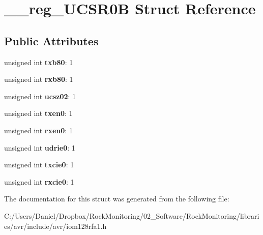 \hypertarget{struct____reg___u_c_s_r0_b}{}\section{\+\_\+\+\_\+reg\+\_\+\+U\+C\+S\+R0B Struct Reference}
\label{struct____reg___u_c_s_r0_b}
\subsection*{Public Attributes}
\begin{DoxyCompactItemize}
\item 
unsigned int {\bfseries txb80}\+: 1\hypertarget{struct____reg___u_c_s_r0_b_adb562bf4f13fedb25dca671f115b79e2}{}\label{struct____reg___u_c_s_r0_b_adb562bf4f13fedb25dca671f115b79e2}

\item 
unsigned int {\bfseries rxb80}\+: 1\hypertarget{struct____reg___u_c_s_r0_b_abae8698593da501386792b7777e99520}{}\label{struct____reg___u_c_s_r0_b_abae8698593da501386792b7777e99520}

\item 
unsigned int {\bfseries ucsz02}\+: 1\hypertarget{struct____reg___u_c_s_r0_b_a448acdc96971fb1689a6fa24acd8318f}{}\label{struct____reg___u_c_s_r0_b_a448acdc96971fb1689a6fa24acd8318f}

\item 
unsigned int {\bfseries txen0}\+: 1\hypertarget{struct____reg___u_c_s_r0_b_acb5856e8bb893d9a1f32c034e5aa905a}{}\label{struct____reg___u_c_s_r0_b_acb5856e8bb893d9a1f32c034e5aa905a}

\item 
unsigned int {\bfseries rxen0}\+: 1\hypertarget{struct____reg___u_c_s_r0_b_a1266f6b6c1b8da2b26c531171ee64cb6}{}\label{struct____reg___u_c_s_r0_b_a1266f6b6c1b8da2b26c531171ee64cb6}

\item 
unsigned int {\bfseries udrie0}\+: 1\hypertarget{struct____reg___u_c_s_r0_b_a01e3fe2c79c5474fd531f3057c6b31e8}{}\label{struct____reg___u_c_s_r0_b_a01e3fe2c79c5474fd531f3057c6b31e8}

\item 
unsigned int {\bfseries txcie0}\+: 1\hypertarget{struct____reg___u_c_s_r0_b_a9171cee2dca3f145df10a3b108255248}{}\label{struct____reg___u_c_s_r0_b_a9171cee2dca3f145df10a3b108255248}

\item 
unsigned int {\bfseries rxcie0}\+: 1\hypertarget{struct____reg___u_c_s_r0_b_a22e92224986b89f7f24ef2866ea21ba7}{}\label{struct____reg___u_c_s_r0_b_a22e92224986b89f7f24ef2866ea21ba7}

\end{DoxyCompactItemize}


The documentation for this struct was generated from the following file\+:\begin{DoxyCompactItemize}
\item 
C\+:/\+Users/\+Daniel/\+Dropbox/\+Rock\+Monitoring/02\+\_\+\+Software/\+Rock\+Monitoring/libraries/avr/include/avr/iom128rfa1.\+h\end{DoxyCompactItemize}
